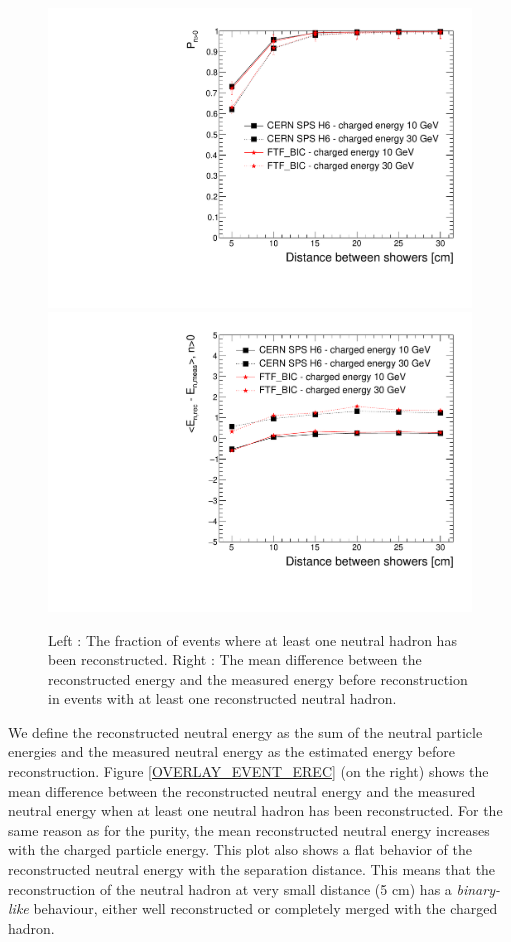 \documentclass[cits]{JINST}
\begin{document}
\begin{figure}[!h]
  \begin{center}
    \includegraphics[width=0.47\linewidth]{plots/OverlayEvent/OverlayEvent_ProbaNeutral.pdf}
    \includegraphics[width=0.47\linewidth]{plots/OverlayEvent/OverlayEvent_EnergyDifference.pdf}
  \end{center}
  \caption{\label{OVERLAY_EVENT_EREC} \label{OVERLAY_EVENT_NEUTRAL_PERCENTAGE} Left : The fraction of events where at least one neutral hadron has been reconstructed. Right : The mean difference between the reconstructed energy and the measured energy before reconstruction in events with at least one reconstructed neutral hadron.}
\end{figure}

We define the reconstructed neutral energy as the sum of the neutral particle energies and the measured neutral energy as the estimated energy before reconstruction. Figure \ref{OVERLAY_EVENT_EREC} (on the right) shows the mean difference between the reconstructed neutral energy and the measured neutral energy when at least one neutral hadron has been reconstructed. For the same reason as for the purity, the mean reconstructed neutral energy increases with the charged particle energy. This plot also shows a flat behavior of the reconstructed neutral energy with the separation distance. This means that the reconstruction of the neutral hadron at very small distance (5 cm) has a \textit{binary-like} behaviour, either well reconstructed or completely merged with the charged hadron.

\newpage
\end{document}
